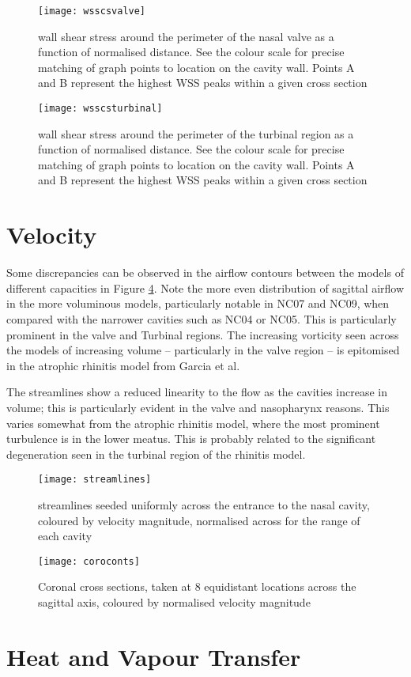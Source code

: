 \begin{figure} 
  \texttt{[image: wsscsvalve]}
  \caption{wall shear stress around the perimeter of the nasal valve as a function of normalised distance. See the colour scale for precise matching of graph points to location on the cavity wall. Points A and B represent the highest WSS peaks within a given cross section}
  \label{fig:wcs}
\end{figure}

\begin{figure} 
  \texttt{[image: wsscsturbinal]}
  \caption{wall shear stress around the perimeter of the turbinal region as a function of normalised distance. See the colour scale for precise matching of graph points to location on the cavity wall. Points A and B represent the highest WSS peaks within a given cross section}
  \label{fig:wcst}
\end{figure}

\section{Velocity}

Some discrepancies can be observed in the airflow contours between the models of different capacities in Figure \ref{fig:vcc}. Note the more even distribution of sagittal airflow in the more voluminous models, particularly notable in NC07 and NC09, when compared with the narrower cavities such as NC04 or NC05. This is particularly prominent in the valve and Turbinal regions. The increasing vorticity seen across the models of increasing volume – particularly in the valve region – is epitomised in the atrophic rhinitis model from Garcia et al\cite{Garcia2007}.

The streamlines show a reduced linearity to the flow as the cavities increase in volume; this is particularly evident in the valve and nasopharynx reasons. This varies somewhat from the atrophic rhinitis model, where the most prominent turbulence is in the lower meatus. This is probably related to the significant degeneration seen in the turbinal region of the rhinitis model.

\begin{figure} 
  \texttt{[image: streamlines]}
  \caption{streamlines seeded uniformly across the entrance to the nasal cavity, coloured by velocity magnitude, normalised across for the range of each cavity}
  \label{fig:vsl}
\end{figure}

\begin{figure} 
  \texttt{[image: coroconts]}
  \caption{Coronal cross sections, taken at 8 equidistant locations across the sagittal axis, coloured by normalised velocity magnitude}
  \label{fig:vcc}
\end{figure}

\section{Heat and Vapour Transfer}
